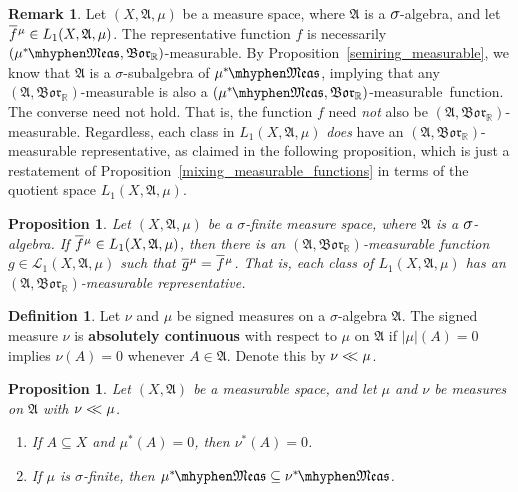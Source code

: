\documentclass[
twoside=true,
paper=letter,
fontsize=9pt,
pagesize=auto,
leqno,
openany,
headsepline,
overfullrule,
]{scrbook}
\theoremstyle{plain}
\theoremstyle{plain}
\newtheorem{prop}[thm]{Proposition}
\theoremstyle{definition}
\newtheorem{defn}[thm]{Definition}
\newtheorem{rmk}[thm]{Remark}
\theoremstyle{bfnoteitalic}
\theoremstyle{bfnoteroman}
\newcommand{\term}[1]{\textbf{#1}\index{#1}}
\newcommand{\sigalg}[1]{\mathfrak{#1}}
\newcommand{\cali}[1]{\mathscr{#1}}
\newcommand{\borel}{\mathfrak{Bor}}
\newcommand{\textsigma}{\hbox{\large{$\sigma$}}\kern-1pt}
\newcommand{\abs}[1]{\left\vert#1\right\vert}
\newcommand{\R}{\mathbb{R}}
\newcommand{\sigmaalgebra}{\sigalg{A}}
\newcommand{\measurable}[1]{{#1}\mhyphen\mathfrak{Meas}}
\newcommand{\kernast}{\ast\kern-1pt}
\newcommand{\mbmeasurable}{$(\measurable{\measure^\kernast},\borel_\R)$\hyp{}measurable}
\newcommand{\measurespace}{X}
\newcommand{\abscont}{\mathrel{< \kern-3.5pt <}}
\newcommand{\measure}{\mu}
\newcommand{\measureii}{\nu}
\newcommand{\seti}{A}
\newcommand*\xbar[1]{%
   \hbox{%
     \vbox{%
       \hrule height 0.4pt %
       \kern0.4ex%
       \hbox{%
         \ensuremath{#1}%
       }%
     }%
   }%
}
\newcommand{\lebclass}[1]{\hspace{.5pt}\xbar{#1}\hspace{0.5pt}}
\newcommand{\ellclass}[2]{\lebclass{#1}^{#2}}
\begin{document}
\begin{rmk}
Let $(\measurespace,\sigmaalgebra,\measure)$ be a measure space, where $\sigmaalgebra$ is a $\textsigma$-algebra, and let $\ellclass{f}{\measure}\in L_1(\measurespace, \sigmaalgebra, \measure)$.  The representative function $f$ is necessarily \mbmeasurable. By Proposition~\ref{semiring_measurable}, we know that $\sigmaalgebra$ is a \textsigma-subalgebra of $\measurable{\measure^\kernast}$, implying that any  
$(\sigmaalgebra, \borel_\R)$\hyp{}measurable is also a  \mbmeasurable\ function.  The converse need not hold.  That is, the function $f$ need \emph{not} also be $(\sigmaalgebra, \borel_\R)$\hyp{}measurable. Regardless, each class in 
$L_1(\measurespace, \sigmaalgebra, \measure)$ \emph{does} have an
$(\sigmaalgebra, \borel_\R)$\hyp{}measurable representative, as claimed in the following proposition, which is just a restatement of Proposition~\ref{mixing_measurable_functions} in terms of the quotient space $L_1(\measurespace, \sigmaalgebra, \measure)$. 
\end{rmk}



\begin{prop}\label{a_measurable_representative}
Let $(\measurespace, \sigmaalgebra, \measure)$ be a \textsigma-finite measure space, where $\sigmaalgebra$ is a $\textsigma$-algebra. 
If $\ellclass{f}{\measure}\in L_1(\measurespace, \sigmaalgebra, \measure)$, then there is an 
$(\sigmaalgebra, \borel_\R)$\hyp{}measurable function 
$g\in \cali{L}_1(\measurespace, \sigmaalgebra, \measure)$ such that 
$\ellclass{g}{\measure} = \ellclass{f}{\measure}$. 
That is, each class of $L_1(\measurespace, \sigmaalgebra, \measure)$ has an 
$(\sigmaalgebra, \borel_\R)$\hyp{}measurable representative.  
\end{prop}


\begin{defn}\label{absolutely_continuous}
Let $\measureii$ and $\measure$ be signed measures on a \textsigma-algebra $\sigmaalgebra$.
The signed measure $\measureii$ is \term{absolutely continuous} with respect to $\measure$ on $\sigmaalgebra$ if 
$\abs{\measure}(\seti) = 0$ 
implies
$\measureii(\seti) = 0$ whenever $\seti\in\sigmaalgebra$. Denote this by 
$\measureii\abscont\measure$.
\end{defn}


\begin{prop}\label{abscont_properties}
Let $(\measurespace,\sigmaalgebra)$ be a measurable space, and let 
$\measure$ and $\measureii$ be measures on $\sigmaalgebra$ with 
$\measureii\abscont\measure$.
\begin{enumerate}
\item
If $\seti \subseteq \measurespace$ and 
$\measure^*(\seti) = 0$, then $\measureii^*(\seti) = 0$.
\item If $\measure$ is \textsigma-finite, then 
$\measurable{\measure^\kernast} \subseteq
\measurable{\measureii^\kernast}$.
\end{enumerate}
\end{prop}
\end{document}
